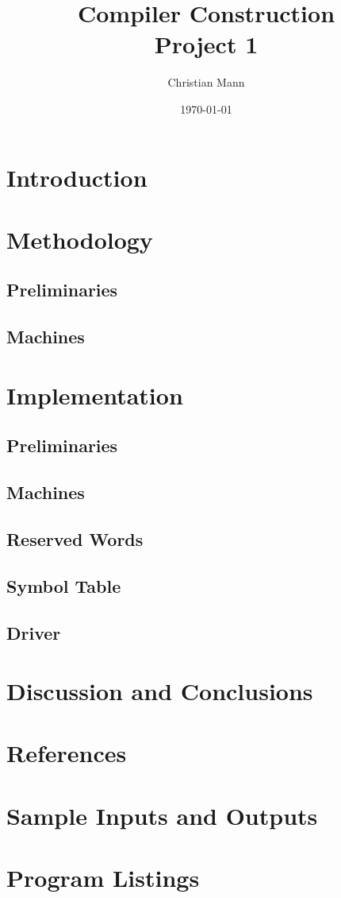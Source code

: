 \documentclass{report}
\author{Christian Mann}
\title{Compiler Construction \\ Project 1}
\date{\today}
\begin{document}
	\titlepage

	\section{Introduction}
	\section{Methodology}
		\subsection{Preliminaries}
		\subsection{Machines}
	\section{Implementation}
		\subsection{Preliminaries}
		\subsection{Machines}
		\subsection{Reserved Words}
		\subsection{Symbol Table}
		\subsection{Driver}
	\section{Discussion and Conclusions}
	\section{References}
	\appendix
	\section{Sample Inputs and Outputs}
	\section{Program Listings}
\end{document}
